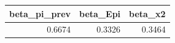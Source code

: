 \begin{tabular}{rrr}
\toprule
beta_pi_prev & beta_Epi & beta_x2 \\
\midrule
0.6674 & 0.3326 & 0.3464 \\
\bottomrule
\end{tabular}
